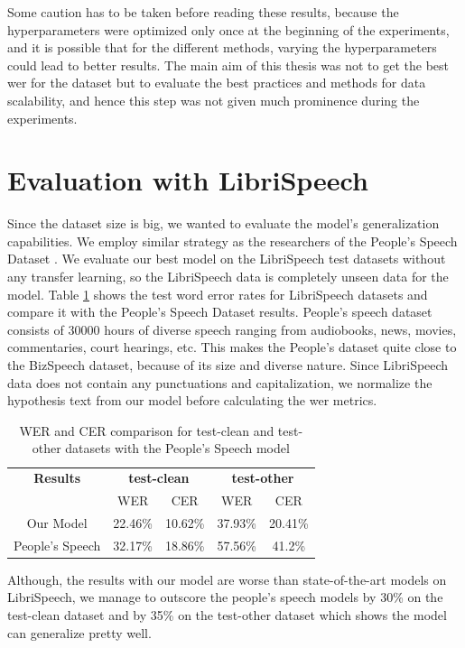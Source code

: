 Some caution has to be taken before reading these results, because the hyperparameters were optimized only once at the beginning of the experiments, and it is possible that for the different methods, varying the hyperparameters could lead to better results. The main aim of this thesis was not to get the best \acrshort{wer} for the dataset but to evaluate the best practices and methods for data scalability, and hence this step was not given much prominence during the experiments. 

\section{Evaluation with LibriSpeech}
Since the dataset size is big, we wanted to evaluate the model's generalization capabilities. We employ similar strategy as the researchers of the People's Speech Dataset \cite{Galvez2021TheUsage}. We evaluate our best model on the LibriSpeech\cite{Panayotov2015Librispeech:Books} test datasets without any transfer learning, so the LibriSpeech data is completely unseen data for the model. Table \ref{table:libri} shows the test word error rates for LibriSpeech datasets and compare it with the People's Speech Dataset results. People's speech dataset consists of 30000 hours of diverse speech ranging from audiobooks, news, movies, commentaries, court hearings, etc. This makes the People's dataset quite close to the BizSpeech dataset, because of its size and diverse nature. Since LibriSpeech data does not contain any punctuations and capitalization, we normalize the hypothesis text from our model before calculating the \acrshort{wer} metrics. 

\begin{table}[ht]
\centering
\begin{tabular}{c | c c | c c }
\hline
\textbf{Results} & \multicolumn{2}{c|}{\textbf{test-clean}} & \multicolumn{2}{c}{\textbf{test-other}}\\\cline{2-5}
    & WER & CER & WER & CER\\
 \hline
  Our Model & 22.46\% & 10.62\% & 37.93\% & 20.41\%\\
  People's Speech \cite{Galvez2021TheUsage} & 32.17\% & 18.86\% & 57.56\% & 41.2\% \\
 \hline
\end{tabular}
\caption{\label{table:libri} WER and CER comparison for test-clean and test-other datasets with the People's Speech model}
\end{table}

Although, the results with our model are worse than state-of-the-art models on LibriSpeech, we manage to outscore the people's speech models by 30\% on the test-clean dataset and by 35\% on the test-other dataset which shows the model can generalize pretty well.


